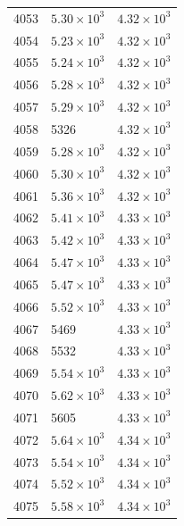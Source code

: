\begin{table}[H]
\begin{tabular}{lll}
4053 & $\displaystyle 5.30 \times 10^{3}$ & $\displaystyle 4.32 \times 10^{3}$ \\
4054 & $\displaystyle 5.23 \times 10^{3}$ & $\displaystyle 4.32 \times 10^{3}$ \\
4055 & $\displaystyle 5.24 \times 10^{3}$ & $\displaystyle 4.32 \times 10^{3}$ \\
4056 & $\displaystyle 5.28 \times 10^{3}$ & $\displaystyle 4.32 \times 10^{3}$ \\
4057 & $\displaystyle 5.29 \times 10^{3}$ & $\displaystyle 4.32 \times 10^{3}$ \\
4058 & 5326 & $\displaystyle 4.32 \times 10^{3}$ \\
4059 & $\displaystyle 5.28 \times 10^{3}$ & $\displaystyle 4.32 \times 10^{3}$ \\
4060 & $\displaystyle 5.30 \times 10^{3}$ & $\displaystyle 4.32 \times 10^{3}$ \\
4061 & $\displaystyle 5.36 \times 10^{3}$ & $\displaystyle 4.32 \times 10^{3}$ \\
4062 & $\displaystyle 5.41 \times 10^{3}$ & $\displaystyle 4.33 \times 10^{3}$ \\
4063 & $\displaystyle 5.42 \times 10^{3}$ & $\displaystyle 4.33 \times 10^{3}$ \\
4064 & $\displaystyle 5.47 \times 10^{3}$ & $\displaystyle 4.33 \times 10^{3}$ \\
4065 & $\displaystyle 5.47 \times 10^{3}$ & $\displaystyle 4.33 \times 10^{3}$ \\
4066 & $\displaystyle 5.52 \times 10^{3}$ & $\displaystyle 4.33 \times 10^{3}$ \\
4067 & 5469 & $\displaystyle 4.33 \times 10^{3}$ \\
4068 & 5532 & $\displaystyle 4.33 \times 10^{3}$ \\
4069 & $\displaystyle 5.54 \times 10^{3}$ & $\displaystyle 4.33 \times 10^{3}$ \\
4070 & $\displaystyle 5.62 \times 10^{3}$ & $\displaystyle 4.33 \times 10^{3}$ \\
4071 & 5605 & $\displaystyle 4.33 \times 10^{3}$ \\
4072 & $\displaystyle 5.64 \times 10^{3}$ & $\displaystyle 4.34 \times 10^{3}$ \\
4073 & $\displaystyle 5.54 \times 10^{3}$ & $\displaystyle 4.34 \times 10^{3}$ \\
4074 & $\displaystyle 5.52 \times 10^{3}$ & $\displaystyle 4.34 \times 10^{3}$ \\
4075 & $\displaystyle 5.58 \times 10^{3}$ & $\displaystyle 4.34 \times 10^{3}$ \\

\end{tabular}
\end{table}
